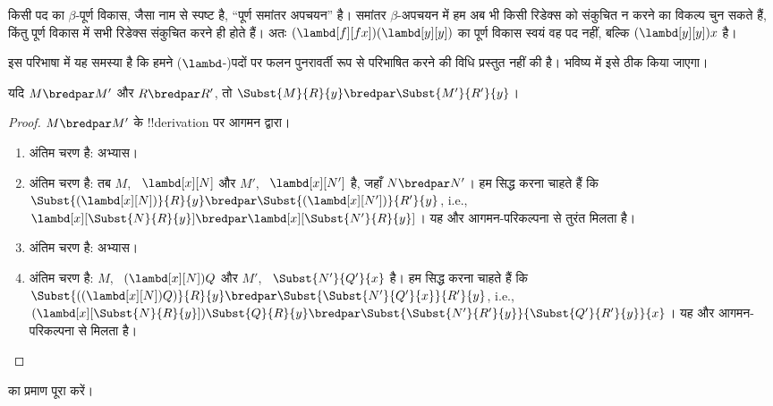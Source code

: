 \documentclass[../../../include/open-logic-section]{subfiles}
\begin{document}
किसी पद का $\beta$-पूर्ण विकास, जैसा नाम से स्पष्ट है, ``पूर्ण समांतर
अपचयन'' है। समांतर $\beta$-अपचयन में हम अब भी किसी रिडेक्स को संकुचित न
करने का विकल्प चुन सकते हैं, किंतु पूर्ण विकास में सभी रिडेक्स संकुचित करने
ही होते हैं। अतः $(\lambd[f][fx])(\lambd[y][y])$ का पूर्ण विकास स्वयं वह
पद नहीं, बल्कि $(\lambd[y][y])x$ है।

\begin{editorial}
  इस परिभाषा में यह समस्या है कि हमने ($\lambd$-)पदों पर फलन पुनरावर्ती
  रूप से परिभाषित करने की विधि प्रस्तुत नहीं की है। भविष्य में इसे ठीक
  किया जाएगा।
\end{editorial}

\begin{lem}
  यदि $M \bredpar M'$ और $R \bredpar R'$, तो $\Subst{M}{R}{y}
  \bredpar \Subst{M'}{R'}{y}$।
\end{lem}

\begin{proof}
  $M \bredpar M'$ के !!{derivation} पर आगमन द्वारा।
  \begin{enumerate}
    \item अंतिम चरण  है: अभ्यास।
    \item अंतिम चरण  है: तब $M$,
      ~$\lambd[x][N]$ और $M'$, ~$\lambd[x][N']$ है, जहाँ $N \bredpar N'$।
      हम सिद्ध करना चाहते हैं कि
      $\Subst{(\lambd[x][N])}{R}{y} \bredpar
      \Subst{(\lambd[x][N'])}{R'}{y}$, i.e.,
      $\lambd[x][\Subst{N}{R}{y}] \bredpar
      \lambd[x][\Subst{N'}{R}{y}]$। यह  और
      आगमन-परिकल्पना से तुरंत मिलता है।
    \item अंतिम चरण  है: अभ्यास।
    \item अंतिम चरण  है: $M$,
      ~$(\lambd[x][N])Q$ और $M'$, ~$\Subst{N'}{Q'}{x}$ है। हम सिद्ध करना
      चाहते हैं कि $\Subst{((\lambd[x][N])Q)}{R}{y} \bredpar
      \Subst{\Subst{N'}{Q'}{x}}{R'}{y}$, i.e.,
      $(\lambd[x][\Subst{N}{R}{y}])\Subst{Q}{R}{y} \bredpar
      \Subst{\Subst{N'}{R'}{y}}{\Subst{Q'}{R'}{y}}{x}$। यह
       और आगमन-परिकल्पना से मिलता है।
  \end{enumerate}
\end{proof}

\begin{prob}
   का प्रमाण पूरा करें।
\end{prob}
\end{document}
